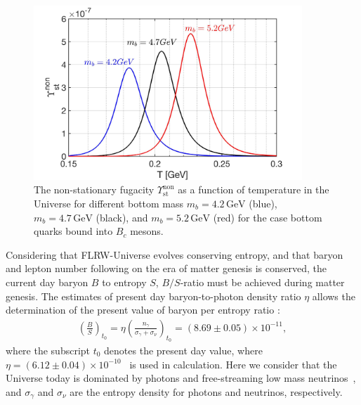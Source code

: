 \begin{figure}[t]
\centerline{\includegraphics[width=0.9\textwidth]{./plots/NonstationaryFugacity}}
\caption{The non-stationary fugacity $\Upsilon_\mathrm{st}^{\mathrm{non}}$ as a function of temperature in the Universe for different bottom mass $m_b=4.2\,\mathrm{GeV}$ (blue), $m_b=4.7\,\mathrm{GeV}$ (black), and $m_b=5.2\,\mathrm{GeV}$ (red) for the case bottom  quarks bound into $B_c$ mesons. }
\label{NonFugacity}
\end{figure}
 

 Considering that FLRW-Universe evolves conserving entropy, and that baryon and lepton number following on the era of matter genesis is conserved, the current day baryon $B$ to entropy $S$, $B/S$-ratio must be achieved during matter genesis. The estimates of present day baryon-to-photon density ratio $\eta$ allows the determination of the present value of baryon per entropy ratio \cite{Rafelski:2019twp,Letessier:2002ony,Fromerth:2002wb,Fromerth:2012fe}:
\begin{align}
\left(\frac{B}{S}\right)_{t_0}\!\!\!\!=\eta\left(\frac{n_\gamma}{\sigma_\gamma+\sigma_\nu}\right)_{\!t_0}\!\!\!\!=(8.69\pm0.05)\!\!\times\!\!10^{-11},
\end{align}
where the subscript $t_0$ denotes the present day value, where $\eta=(6.12\pm0.04)\times10^{-10}$~\cite{ParticleDataGroup:2018ovx} is used in calculation. Here we consider that the Universe today is dominated by photons and free-streaming low mass neutrinos~\cite{Birrell:2012gg}, and $\sigma_\gamma$ and $\sigma_\nu$ are the entropy density for photons and neutrinos, respectively. 
 
